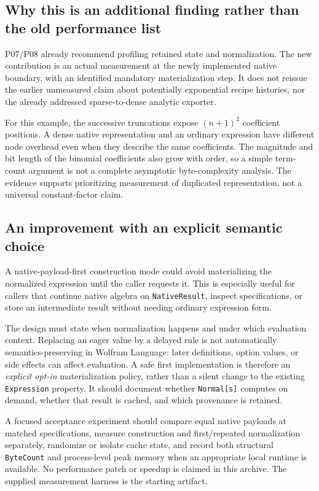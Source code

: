\documentclass[11pt]{article}
\newcommand{\code}[1]{\texttt{#1}}
\begin{document}
\subsection{Why this is an additional finding rather than the old performance list}
P07/P08 already recommend profiling retained state and normalization. The new contribution is an actual measurement at the newly implemented native boundary, with an identified mandatory materialization step. It does not reissue the earlier unmeasured claim about potentially exponential recipe histories, nor the already addressed sparse-to-dense analytic exporter.\cite{register}

For this example, the successive truncations expose $(n+1)^2$ coefficient positions. A dense native representation and an ordinary expression have different node overhead even when they describe the same coefficients. The magnitude and bit length of the binomial coefficients also grow with order, so a simple term-count argument is not a complete asymptotic byte-complexity analysis. The evidence supports prioritizing measurement of duplicated representation, not a universal constant-factor claim.

\subsection{An improvement with an explicit semantic choice}
A native-payload-first construction mode could avoid materializing the normalized expression until the caller requests it. This is especially useful for callers that continue native algebra on \code{NativeResult}, inspect specifications, or store an intermediate result without needing ordinary expression form.

The design must state when normalization happens and under which evaluation context. Replacing an eager value by a delayed rule is not automatically semantics-preserving in Wolfram Language: later definitions, option values, or side effects can affect evaluation. A safe first implementation is therefore an \emph{explicit opt-in} materialization policy, rather than a silent change to the existing \code{Expression} property. It should document whether \code{Normal[s]} computes on demand, whether that result is cached, and which provenance is retained.

A focused acceptance experiment should compare equal native payloads at matched specifications, measure construction and first/repeated normalization separately, randomize or isolate cache state, and record both structural \code{ByteCount} and process-level peak memory when an appropriate local runtime is available. No performance patch or speedup is claimed in this archive. The supplied measurement harness is the starting artifact.
\end{document}
